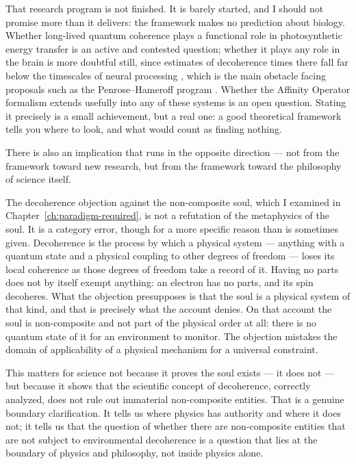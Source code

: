 That research program is not finished.  It is barely started, and I should
not promise more than it delivers: the framework makes no prediction about
biology.  Whether long-lived quantum coherence plays a functional role in
photosynthetic energy
transfer is an active and contested question; whether it plays any role in the
brain is more doubtful still, since estimates of decoherence times there fall
far below the timescales of neural processing \citep{Tegmark2000}, which is the
main obstacle facing proposals such as the Penrose--Hameroff program
\citep{HameroffPenrose2014}.  Whether the Affinity Operator formalism extends
usefully into any of these systems is an open question.  Stating it precisely
is a small achievement, but a real one: a good theoretical framework tells you
where to look, and what would count as finding nothing.

There is also an implication that runs in the opposite direction --- not from
the framework toward new research, but from the framework toward the
philosophy of science itself.

The decoherence objection against the non-composite soul, which I examined
in Chapter~\ref{ch:paradigm-required}, is not a refutation of the \bahai
metaphysics of the soul.  It is a category error, though for a more specific
reason than is sometimes given.  Decoherence is the process by which a physical
system --- anything with a quantum state and a physical coupling to other
degrees of freedom --- loses its local coherence as those degrees of freedom
take a record of it.  Having no parts does not by itself exempt anything: an
electron has no parts, and its spin decoheres.  What the objection presupposes
is that the soul is a physical system of that kind, and that is precisely what
the \bahai account denies.  On that account the soul is non-composite and not
part of the physical order at all: there is no quantum state of it for an
environment to monitor.  The
objection mistakes the domain of applicability of a physical mechanism for a
universal constraint.

This matters for science not because it proves the soul exists --- it does not ---
but because it shows that the scientific concept of decoherence, correctly
analyzed, does not rule out immaterial non-composite entities.  That is a
genuine boundary clarification.  It tells us where physics has authority and
where it does not; it tells us that the question of whether there are non-composite
entities that are not subject to environmental decoherence is a question that
lies at the boundary of physics and philosophy, not inside physics alone.

